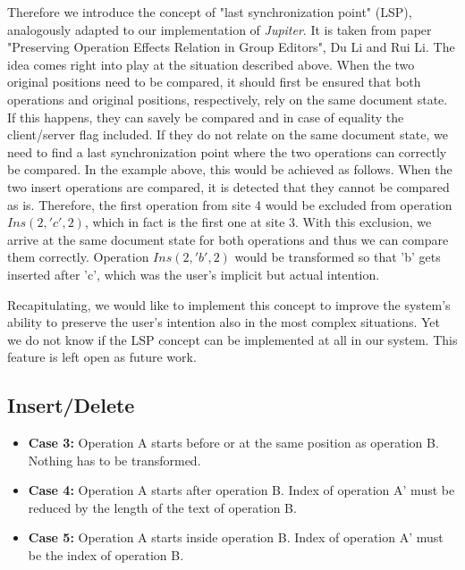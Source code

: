 \begin{itemize}
Therefore we introduce the concept of "last synchronization point" (LSP), analogously adapted to our implementation of \emph{Jupiter}. It is taken from paper "Preserving Operation Effects Relation in Group Editors", Du Li and Rui Li. The idea comes right into play at the situation described above. When the two original positions need to be compared, it should first be ensured that both operations and original positions, respectively, rely on the same document state. If this happens, they can savely be compared and in case of equality the client/server flag included. If they do not relate on the same document state, we need to find a last synchronization point where the two operations can correctly be compared. In the example above, this would be achieved as follows. When the two insert operations are compared, it is detected that they cannot be compared as is. Therefore, the first operation from site 4 would be excluded from  operation $Ins(2,'c',2)$, which in fact is the first one at site 3. With this exclusion, we arrive at the same document state for both operations and thus we can compare them correctly. Operation $Ins(2,'b',2)$ would be transformed so that 'b' gets inserted after 'c', which was the user's implicit but actual intention.

Recapitulating, we would like to implement this concept to improve the system's ability to preserve the user's intention also in the most complex situations. Yet we do not know if the LSP concept can be implemented at all in our system. This feature is left open as future  work.
\end{itemize}

\subsection{Insert/Delete}
\begin{itemize}
\item \textbf{Case 3:}
Operation A starts before or at the same position as operation B. Nothing has to be transformed.
\item \textbf{Case 4:}
Operation A starts after operation B. Index of operation A' must be reduced by the length of the text of operation B.
\item \textbf{Case 5:}
Operation A starts inside operation B. Index of operation A' must be the index of operation B.
\end{itemize}

